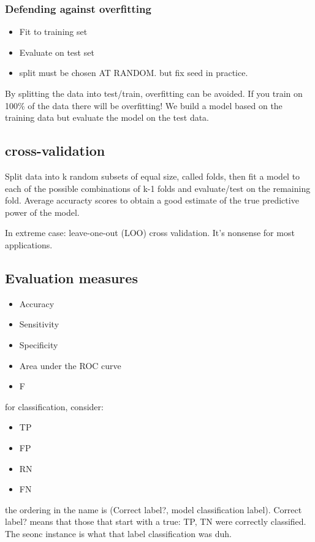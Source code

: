 \documentclass{article}
\begin{document}
\subsubsection{Defending against overfitting}
\begin{itemize}
\item Fit to training set
\item Evaluate on test set
\item split must be chosen AT RANDOM. but fix seed in practice.
\end{itemize}


By splitting the data into test/train, overfitting can be avoided. If you train on 100\% of the data there will be overfitting!
We build a model based on the training data but evaluate the model on the test data. 

\subsection{cross-validation}
Split data into k random subsets of equal size, called folds, then fit a model to each of the possible combinations of k-1 folds and evaluate/test on the remaining fold. Average accuracty scores to obtain a good estimate of the true predictive power of the model.

In extreme case: leave-one-out (LOO) cross validation. It's nonsense for most applications.

\subsection{Evaluation measures}
\begin{itemize}
\item Accuracy
\item Sensitivity 
\item Specificity
\item Area under the ROC curve
\item F
\end{itemize}

for classification, consider: 
\begin{itemize}
\item TP 
\item FP
\item RN
\item FN
\end{itemize}

the ordering in the name is (Correct label?, model classification label). Correct label? means that those that start with a true: TP, TN were correctly classified. The seonc instance is what that label classification was duh.
\end{document}
